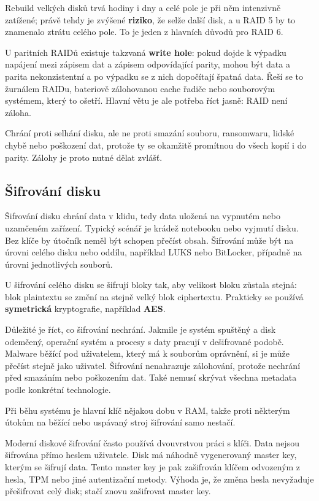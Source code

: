 \documentclass[11pt,a4paper]{article}
\begin{document}
Rebuild velkých disků trvá hodiny i dny a celé pole je při něm intenzivně zatížené; právě tehdy je zvýšené \textbf{riziko}, že selže další disk, a u RAID 5 by to znamenalo ztrátu celého pole. To je jeden z hlavních důvodů pro RAID 6.

U paritních RAIDů existuje takzvaná \textbf{write hole}: pokud dojde k výpadku napájení mezi zápisem dat a zápisem odpovídající parity, mohou být data a parita nekonzistentní a po výpadku se z nich dopočítají špatná data. Řeší se to žurnálem RAIDu, bateriově zálohovanou cache řadiče nebo souborovým systémem, který to ošetří. Hlavní větu je ale potřeba říct jasně: RAID není záloha.

Chrání proti selhání disku, ale ne proti smazání souboru, ransomwaru, lidské chybě nebo poškození dat, protože ty se okamžitě promítnou do všech kopií i do parity. Zálohy je proto nutné dělat zvlášť.

\subsection*{Šifrování disku}

Šifrování disku chrání data v klidu, tedy data uložená na vypnutém nebo uzamčeném zařízení. Typický scénář je krádež notebooku nebo vyjmutí disku. Bez klíče by útočník neměl být schopen přečíst obsah. Šifrování může být na úrovni celého disku nebo oddílu, například LUKS nebo BitLocker, případně na úrovni jednotlivých souborů.

U šifrování celého disku se šifrují bloky tak, aby velikost bloku zůstala stejná: blok plaintextu se změní na stejně velký blok ciphertextu. Prakticky se používá \textbf{symetrická} kryptografie, například \textbf{AES}.

Důležité je říct, co šifrování nechrání. Jakmile je systém spuštěný a disk odemčený, operační systém a procesy s daty pracují v dešifrované podobě. Malware běžící pod uživatelem, který má k souborům oprávnění, si je může přečíst stejně jako uživatel. Šifrování nenahrazuje zálohování, protože nechrání před smazáním nebo poškozením dat. Také nemusí skrývat všechna metadata podle konkrétní technologie.

Při běhu systému je hlavní klíč nějakou dobu v RAM, takže proti některým útokům na běžící nebo uspávaný stroj šifrování samo nestačí.

Moderní diskové šifrování často používá dvouvrstvou práci s klíči. Data nejsou šifrována přímo heslem uživatele. Disk má náhodně vygenerovaný master key, kterým se šifrují data. Tento master key je pak zašifrován klíčem odvozeným z hesla, TPM nebo jiné autentizační metody. Výhoda je, že změna hesla nevyžaduje přešifrovat celý disk; stačí znovu zašifrovat master key.
\end{document}
